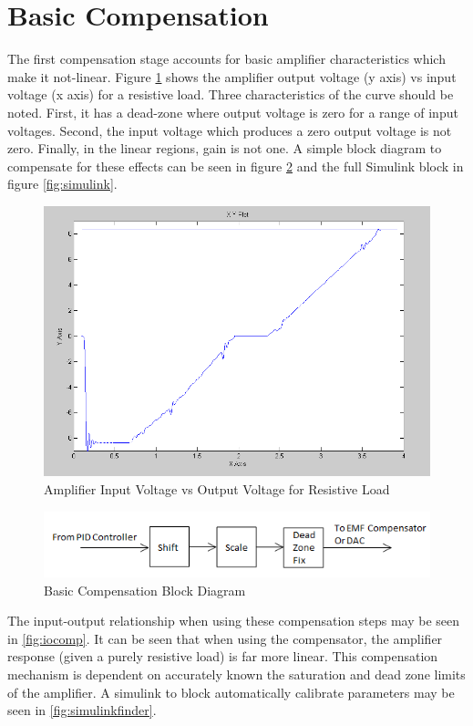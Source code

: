 \section{Basic Compensation}
\label{sec:basic}

The first compensation stage accounts for basic amplifier characteristics which make it not-linear.
Figure \ref{fig:iobasic} shows the amplifier output voltage (y axis) vs input voltage (x axis) for a resistive load.
Three characteristics of the curve should be noted.
First, it has a dead-zone where output voltage is zero for a range of input voltages.
Second, the input voltage which produces a zero output voltage is not zero.
Finally, in the linear regions, gain is not one.
A simple block diagram to compensate for these effects can be seen in figure \ref{fig:iobasiccomp} and the full Simulink block in figure \ref{fig:simulink}.

\begin{figure}[ht]
    \centering
    \includegraphics[width=.70\textwidth]{images/InputVsOutputResistive2.PNG}
    \caption{Amplifier Input Voltage vs Output Voltage for Resistive Load}
    \label{fig:iobasic}
\end{figure}

\begin{figure}[ht]
    \centering
    \includegraphics[width=.65\textwidth]{images/BasicCompensator.PNG}
    \caption{Basic Compensation Block Diagram}
    \label{fig:iobasiccomp}
\end{figure}

The input-output relationship when using these compensation steps may be seen in \ref{fig:iocomp}.
It can be seen that when using the compensator, the amplifier response (given a purely resistive load) is far more linear.
This compensation mechanism is dependent on accurately known the saturation and dead zone limits of the amplifier.
A simulink to block automatically calibrate parameters may be seen in \ref{fig:simulinkfinder}.

